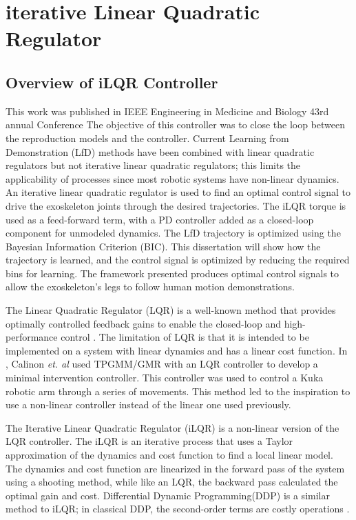 \section{iterative Linear Quadratic Regulator}
\label{sec:ilqr}

\subsection{Overview of iLQR Controller}
This work was published in IEEE Engineering in Medicine and Biology 43rd annual Conference \cite{goldfarb2021control}
The objective of this controller was to close the loop between the reproduction models and the controller. Current Learning from Demonstration (LfD) methods have been combined with linear quadratic regulators but not iterative linear quadratic regulators; this limits the applicability of processes since most robotic systems have non-linear dynamics. An iterative linear quadratic regulator is used to find an optimal control signal to drive the exoskeleton joints through the desired trajectories. The iLQR torque is used as a feed-forward term, with a PD controller added as a closed-loop component for unmodeled dynamics. The LfD trajectory is optimized using the Bayesian Information Criterion (BIC). This dissertation will show how the trajectory is learned, and the control signal is optimized by reducing the required bins for learning. The framework presented produces optimal control signals to allow the exoskeleton's legs to follow human motion demonstrations.

The Linear Quadratic Regulator (LQR) is a well-known method that provides optimally controlled feedback gains to enable the closed-loop and high-performance control \cite{kirk2004optimal}. The limitation of LQR is that it is intended to be implemented on a system with linear dynamics and has a linear cost function. In \cite{TPGMM_calinon2016}, Calinon \textit{et. al} used TPGMM/GMR with an LQR controller to develop a minimal intervention controller. This controller was used to control a Kuka robotic arm \cite{schreiber2010fast} through a series of movements. This method led to the inspiration to use a non-linear controller instead of the linear one used previously.  

The Iterative Linear Quadratic Regulator (iLQR) is a non-linear version of the LQR controller. The iLQR is an iterative process that uses a Taylor approximation of the dynamics and cost function to find a local linear model. The dynamics and cost function are linearized in the forward pass of the system using a shooting method, while like an LQR, the backward pass calculated the optimal gain and cost. Differential Dynamic Programming(DDP) is a similar method to iLQR; in classical DDP, the second-order terms are costly operations \cite{iLQR_tassa2014}  \cite{iLQR_Zachary2016}. 

